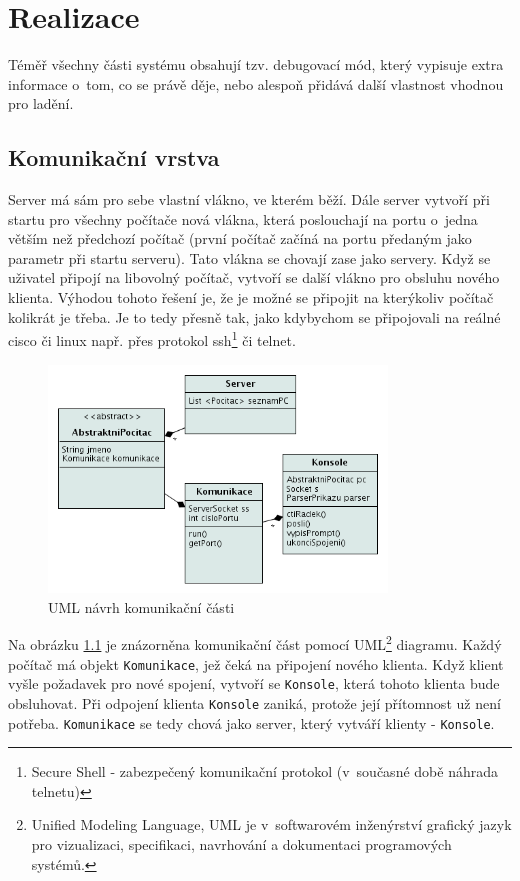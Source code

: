 \chapter{Realizace} \label{realizace}

Téměř všechny části systému obsahují tzv. debugovací mód, který vypisuje extra informace o~tom, co se právě děje, nebo alespoň přidává další vlastnost vhodnou pro ladění.

\section{Komunikační vrstva}
Server má sám pro sebe vlastní vlákno, ve kterém běží. Dále server vytvoří při startu pro všechny počítače nová vlákna, která poslouchají na portu o~jedna větším než předchozí počítač (první počítač začíná na portu předaným jako parametr při startu serveru). Tato vlákna se chovají zase jako servery. Když se uživatel připojí na libovolný počítač, vytvoří se další vlákno pro obsluhu nového klienta. Výhodou tohoto řešení je, že je možné se připojit na kterýkoliv počítač kolikrát je třeba. Je to tedy přesně tak, jako kdybychom se připojovali na reálné cisco či linux např. přes protokol ssh\footnote{Secure Shell - zabezpečený komunikační protokol (v~současné době náhrada telnetu)} či telnet.

\begin{figure}[h]
\begin{center}
\includegraphics[width=9cm]{figures/uml_sit}
\caption{UML návrh komunikační části}
\label{uml:sit}
\end{center}
\end{figure}

Na obrázku \ref{uml:sit} je znázorněna komunikační část pomocí UML\footnote{Unified Modeling Language, UML je v~softwarovém inženýrství grafický jazyk pro vizualizaci, specifikaci, navrhování a dokumentaci programových systémů.\cite{wiki:uml}} diagramu. Každý počítač má objekt \verb|Komunikace|, jež čeká na připojení nového klienta. Když klient vyšle požadavek pro nové spojení, vytvoří se \verb|Konsole|, která tohoto klienta bude obsluhovat. Při odpojení klienta \verb|Konsole| zaniká, protože její přítomnost už není potřeba. \verb|Komunikace| se tedy chová jako server, který vytváří klienty - \verb|Konsole|.

